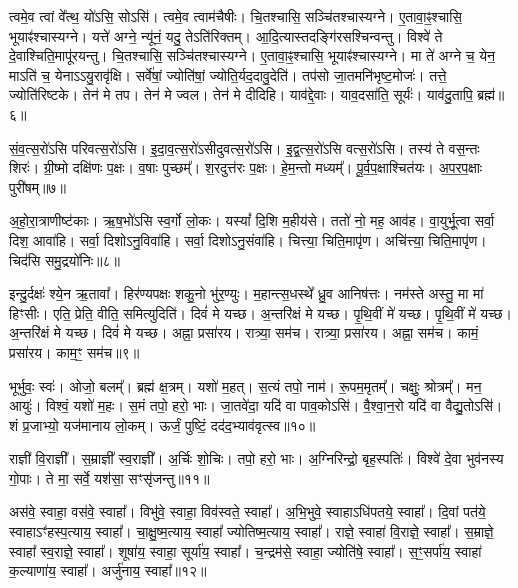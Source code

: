    त्वमे॒व त्वां वे᳚त्थ॒ यो॑ऽसि॒ सोऽसि॑।
   त्वमे॒व त्वाम॑चैषीः।
   चि॒तश्चासि॒ सञ्चि॑तश्चास्यग्ने।
   ए॒तावा॒ꣴ॒श्चासि॒ भूयाꣴ॑श्चास्यग्ने।
   यत्ते॑ अग्ने॒ न्यू॑नं॒ यदु॒ तेऽति॑रिक्तम्।
   आ॒दि॒त्यास्तदङ्गि॑रस\-श्चिन्वन्तु।
   विश्वे॑ ते दे॒वाश्चिति॒मापू॑रयन्तु।
   चि॒तश्चासि॒ सञ्चि॑तश्चास्यग्ने।
   ए॒तावा॒ꣴ॒श्चासि॒ भूयाꣴ॑श्चास्यग्ने।
   मा ते॑ अग्ने च॒ येन॒ माऽति॑ च॒ येनाऽऽयु॒रावृ॑क्षि।
   सर्वे॑षां॒ ज्योति॑षां॒ ज्योति॒र्यद॒दावु॒देति॑।
   तप॑सो जा॒तमनि॑भृष्ट॒मोजः॑।
   तत्ते॒ ज्योति॑रिष्टके।
   तेन॑ मे तप।
   तेन॑ मे ज्वल।
   तेन॑ मे दीदिहि।
   याव॑द्दे॒वाः।
   याव॒दसा॑ति॒ सूर्यः॑।
   याव॑दु॒तापि॒ ब्रह्म॑॥६॥
\anuvakamend

   सं॒व॒त्स॒रो॑ऽसि परिवत्स॒रो॑\-ऽसि।
   इ॒दा॒व॒त्स॒रो॑ऽसीदुवत्स॒रो॑\-ऽसि।
   इ॒द्व॒त्स॒रो॑ऽसि वत्स॒रो॑\-ऽसि।
   तस्य॑ ते वस॒न्तः शिरः॑।
   ग्री॒ष्मो दक्षि॑णः प॒क्षः।
   व॒षाः पुच्छम्᳚।
   श॒रदुत्त॑रः प॒क्षः।
   हे॒म॒न्तो मध्यम्᳚।
   पू॒र्व॒प॒क्षाश्चित॑यः।
   अ॒प॒र॒प॒क्षाः पुरी॑षम्॥७॥

   अ॒हो॒रा॒त्राणीष्ट॑काः।
   ऋ॒ष॒भो॑ऽसि स्व॒र्गो लो॒कः।
   यस्यां᳚ दि॒शि म॒हीय॑से।
   ततो॑ नो॒ मह॒ आव॑ह।
   वा॒युर्भू॒त्वा सर्वा॒ दिश॒ आवा॑हि।
   सर्वा॒ दिशोऽनु॒विवा॑हि।
   सर्वा॒ दिशोऽनु॒संवा॑हि।
   चित्त्या॒ चिति॒मापृ॑ण।
   अचि॑त्त्या॒  चिति॒मापृ॑ण।
   चिद॑सि समु॒द्रयो॑निः॥८॥

   इन्दु॒र्दक्षः॑ श्ये॒न ऋ॒तावा᳚।
   हिर॑ण्यपक्षः शकु॒नो भु॑र॒ण्युः।
   म॒हान्त्स॒धस्थे᳚ ध्रु॒व आनिष॑त्तः।
   नम॑स्ते अस्तु॒ मा मा॑ हिꣳसीः।
   एति॒ प्रेति॒ वीति॒ समित्युदिति॑।
   दिवं॑ मे यच्छ।
   अ॒न्तरि॑क्षं मे यच्छ।
   पृ॒थि॒वीं मे॑ यच्छ।
   पृ॒थि॒वीं मे॑ यच्छ।
   अ॒न्तरि॑क्षं मे यच्छ।
   दिवं॑ मे यच्छ।
   अह्ना॒ प्रसा॑रय।
   रात्र्या॒ सम॑च।
   रात्र्या॒ प्रसा॑रय।
   अह्ना॒ सम॑च।
   कामं॒ प्रसा॑रय।
   काम॒ꣳ॒ सम॑च॥९॥
   \anuvakamend

   भूर्भुवः॒ स्वः॑।
   ओजो॒ बलम्᳚।
   ब्रह्म॑ क्ष॒त्रम्।
   यशो॑ म॒हत्।
   स॒त्यं तपो॒ नाम॑।
   रू॒पम॒मृतम्᳚।
   चक्षुः॒ श्रोत्रम्᳚।
   मन॒ आयुः॑।
   विश्वं॒ यशो॑ म॒हः।
   स॒मं तपो॒ हरो॒ भाः।
   जा॒तवे॑दा॒ यदि॑ वा पाव॒कोऽसि॑।
   वै॒श्वा॒न॒रो यदि॑ वा वैद्यु॒तोऽसि॑।
   शं प्र॒जाभ्यो॒ यज॑मानाय लो॒कम्।
   ऊर्जं॒ पुष्टिं॒ दद॑द॒भ्याव॑वृत्स्व॥१०॥
   \anuvakamend

   राज्ञी॑ वि॒राज्ञी᳚।
   स॒म्राज्ञी᳚ स्व॒राज्ञी᳚।
   अ॒र्चिः शो॒चिः।
   तपो॒ हरो॒ भाः।
   अ॒ग्निरिन्द्रो॒ बृह॒स्पतिः॑।
   विश्वे॑ दे॒वा भुव॑नस्य गो॒पाः।
   ते मा॒ सर्वे॒ यश॑सा॒ सꣳसृ॑जन्तु॥११॥
\anuvakamend

   अस॑वे॒ स्वाहा॒ वस॑वे॒ स्वाहा᳚।
   विभु॑वे॒ स्वाहा॒ विव॑स्वते॒ स्वाहा᳚।
   अ॒भि॒भुवे॒ स्वाहाऽधि॑पतये॒ स्वाहा᳚।
   दि॒वां पत॑ये॒ स्वाहाऽꣳ॑हस्प॒त्याय॒ स्वाहा᳚।
   चा॒क्षु॒ष्म॒त्याय॒ स्वाहा᳚ ज्योतिष्म॒त्याय॒ स्वाहा᳚।
   राज्ञे॒ स्वाहा॑ वि॒राज्ञे॒ स्वाहा᳚।
   स॒म्राज्ञे॒ स्वाहा᳚ स्व॒राज्ञे॒ स्वाहा᳚।
   शूषा॑य॒ स्वाहा॒ सूर्या॑य॒ स्वाहा᳚।
   च॒न्द्रम॑से॒ स्वाहा॒ ज्योति॑षे॒ स्वाहा᳚।
   स॒ꣳ॒सर्पा॑य॒ स्वाहा॑ क॒ल्याणा॑य॒ स्वाहा᳚।
   अर्जु॑नाय॒ स्वाहा᳚॥१२॥
\anuvakamend

